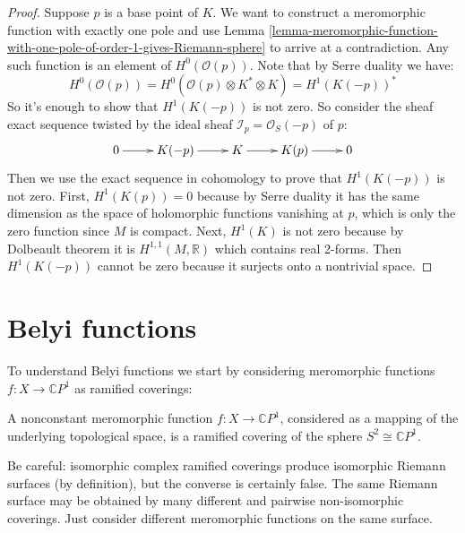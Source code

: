 \begin{proof}
Suppose $p$ is a base point of $K$. We want to construct a meromorphic function
with exactly one pole and use Lemma
\ref{lemma-meromorphic-function-with-one-pole-of-order-1-gives-Riemann-sphere}
to arrive at a contradiction. Any such function is an element of
$H^{0}(\mathcal{O}(p))$. Note that by Serre duality we have:
$$
H^{0}(\mathcal{O}(p))=H^{0}(\mathcal{O}(p)\otimes K^*\otimes K)
=H^{1}(K(-p))^*
$$
So it's enough to show that $H^{1}(K(-p))$ is not zero. So consider the sheaf 
exact sequence twisted by the ideal sheaf $\mathcal{I}_p=\mathcal{O}_S(-p)$ 
of $p$:
$$
\xymatrix{
0\ar[r]&K(-p)\ar[r]&K\ar[r]&K(p)\ar[r]&0
}
$$
Then we use the exact sequence in cohomology to prove that $H^{1}(K(-p))$ is not
zero. First, $H^{1}(K(p))=0$ because by Serre duality it has the same dimension
as the space of holomorphic functions vanishing at $p$, which is only the zero
function since $M$ is compact. Next, $H^{1}(K)$ is not zero because by Dolbeault
theorem it is $H^{1,1}(M,\mathbb{R})$ which contains real 2-forms. Then
$H^{1}(K(-p))$ cannot be zero because it surjects onto a nontrivial space.
\end{proof}

\section{Belyi functions}
\label{section-Belyi-functions}

To understand Belyi functions we start by considering meromorphic functions
$f:X\to \mathbb{C}P^{1}$ as ramified coverings:

\begin{proposition}
\label{proposition-meromorphic-functions-are-ramified-coverings}
\begin{reference}
\cite[Proposition 1.8.9]{lando}
\end{reference}
A nonconstant meromorphic function $f:X\to\mathbb{C}P^{1}$, considered as a
mapping of the underlying topological space, is a ramified covering of the
sphere $S^2\cong\mathbb{C}P^{1}$.
\end{proposition}

Be careful: isomorphic complex ramified coverings produce isomorphic Riemann
surfaces (by definition), but the converse is certainly false. The same Riemann
surface may be obtained by many different and pairwise non-isomorphic coverings.
Just consider different meromorphic functions on the same surface.

\medskip\noindent

